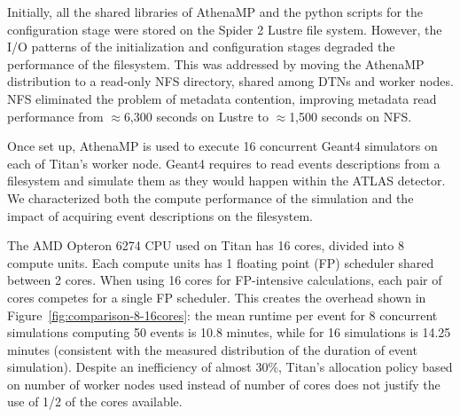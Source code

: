 Initially, all the shared libraries of AthenaMP and the python scripts for the
configuration stage were stored on the Spider 2 Lustre file system. However, the
I/O patterns of the initialization and configuration stages degraded the
performance of the filesystem. This was addressed by moving the AthenaMP
distribution to a read-only NFS directory, shared among DTNs and worker nodes.
NFS eliminated the problem of metadata contention, improving metadata read
performance from $\approx$6,300 seconds on Lustre to $\approx$1,500 seconds on
NFS.



Once set up, AthenaMP is used to execute 16 concurrent Geant4 simulators on each
of Titan's worker node. Geant4 requires to read events descriptions from a
filesystem and simulate them as they would happen within the ATLAS detector. We
characterized both the compute performance of the simulation and the impact of
acquiring event descriptions on the filesystem.

The AMD Opteron 6274 CPU used on Titan has 16 cores, divided into 8 compute
units. Each compute units has 1 floating point (FP) scheduler shared between 2
cores. When using 16 cores for FP-intensive calculations, each pair of cores
competes for a single FP scheduler. This creates the overhead shown in
Figure~\ref{fig:comparison-8-16cores}: the mean runtime per event for 8
concurrent simulations computing 50 events is 10.8 minutes, while for 16
simulations is 14.25 minutes (consistent with the measured distribution of the
duration of event simulation). Despite an inefficiency of almost 30\%, Titan's
allocation policy based on number of worker nodes used instead of number of
cores does not justify the use of 1/2 of the cores available.


